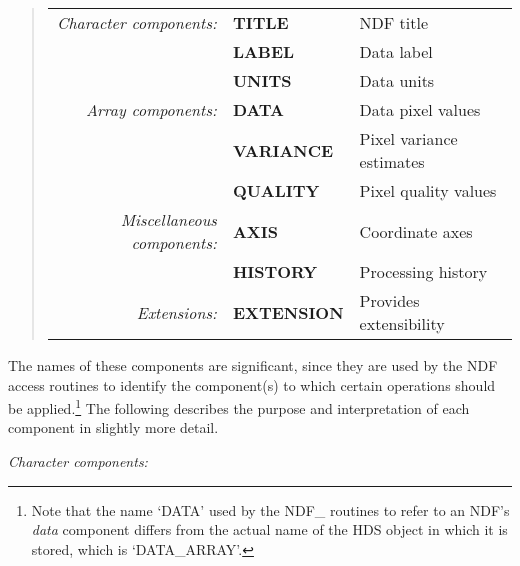 \begin{quote}

\begin{small}
\begin{center}
\begin{tabular}{rl@{ --- }l}
    {\em Character components:} & {\bf TITLE} & NDF title\\
                                & {\bf LABEL} & Data label\\
                                & {\bf UNITS} & Data units\\[1ex]
        {\em Array components:} & {\bf DATA}  & Data pixel values\\
                                & {\bf VARIANCE} & Pixel variance estimates\\
                                & {\bf QUALITY} & Pixel quality values\\[1ex]
{\em Miscellaneous components:} & {\bf AXIS}  & Coordinate axes\\
                                & {\bf HISTORY} & Processing 
                                                  history\footnotemark\\[1ex]
              {\em Extensions:} & {\bf EXTENSION} & Provides extensibility
\end{tabular}
\end{center}
\end{small}

\end{quote}

The names of these components are significant, since they are used by the
NDF access routines to identify the component(s) to which certain operations
should be applied.\footnote{Note that the name `DATA' used by the NDF\_
routines to refer to an NDF's {\em data\/} component differs from the actual
name of the HDS object in which it is stored, which is `DATA\_ARRAY'.} 
The following describes the purpose and interpretation of each component in 
slightly more detail.

{\large \em Character components:}

